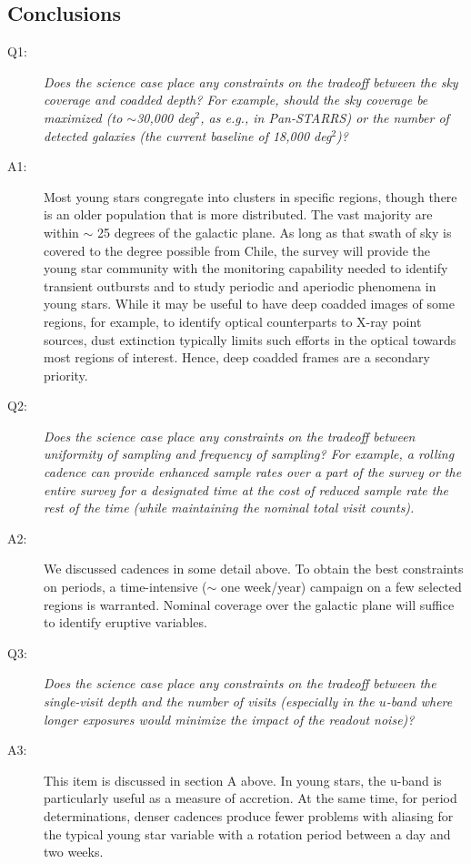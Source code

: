 \subsection{Conclusions}
\begin{description}
\item[Q1:] {\it Does the science case place any constraints on the
tradeoff between the sky coverage and coadded depth? For example, should
the sky coverage be maximized (to $\sim$30,000 deg$^2$, as e.g., in
Pan-STARRS) or the number of detected galaxies (the current baseline 
of 18,000 deg$^2$)?}
%
\item[A1:] 
Most young stars congregate into clusters in specific regions, though there is an older
population that is more distributed. The vast majority are within $\sim$ 25 degrees of the
galactic plane. As long as that swath of sky is covered to the degree possible from Chile,
the survey will provide the young star community with the monitoring capability needed to
identify transient outbursts and to study periodic and aperiodic phenomena in young stars.
While it may be useful to have deep coadded images of some regions, for example, to identify
optical counterparts to X-ray point sources, dust extinction typically limits such efforts
in the optical towards most regions of interest.  Hence, deep coadded frames are a secondary
priority.

\item[Q2:] {\it Does the science case place any constraints on the
tradeoff between uniformity of sampling and frequency of  sampling? For
example, a rolling cadence can provide enhanced sample rates over a part
of the survey or the entire survey for a designated time at the cost of
reduced sample rate the rest of the time (while maintaining the nominal
total visit counts).}

\item[A2:] 
We discussed cadences in some detail above. To obtain the best constraints on periods, a time-intensive
($\sim$ one week/year) campaign on a few selected regions is warranted. Nominal coverage over the
galactic plane will suffice to identify eruptive variables.

\item[Q3:] {\it Does the science case place any constraints on the
tradeoff between the single-visit depth and the number of visits
(especially in the $u$-band where longer exposures would minimize the
impact of the readout noise)?}

\item[A3:] 
This item is discussed in section A above. In young stars, the u-band is particularly useful
as a measure of accretion. At the same time, for period determinations, denser cadences produce
fewer problems with aliasing for the typical young star variable with a rotation period between
a day and two weeks.


\end{description}
